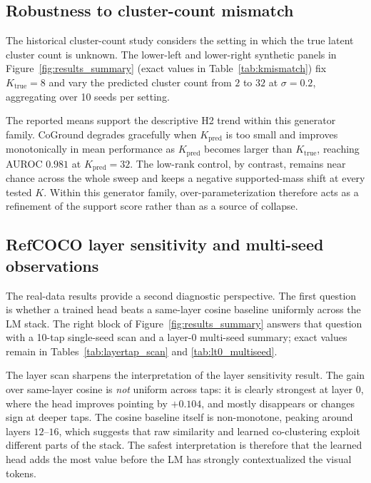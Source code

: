 \documentclass[11pt,a4paper]{article}
\begin{document}
\subsection{Robustness to cluster-count mismatch}

The historical cluster-count study considers the setting in which the true latent cluster count is unknown. The lower-left and lower-right synthetic panels in Figure~\ref{fig:results_summary} (exact values in Table~\ref{tab:kmismatch}) fix $K_{\mathrm{true}}=8$ and vary the predicted cluster count from $2$ to $32$ at $\sigma=0.2$, aggregating over 10 seeds per setting.

The reported means support the descriptive H2 trend within this generator family. CoGround degrades gracefully when $K_{\mathrm{pred}}$ is too small and improves monotonically in mean performance as $K_{\mathrm{pred}}$ becomes larger than $K_{\mathrm{true}}$, reaching AUROC $0.981$ at $K_{\mathrm{pred}}=32$. The low-rank control, by contrast, remains near chance across the whole sweep and keeps a negative supported-mass shift at every tested $K$. Within this generator family, over-parameterization therefore acts as a refinement of the support score rather than as a source of collapse.

\subsection{RefCOCO layer sensitivity and multi-seed observations}

The real-data results provide a second diagnostic perspective. The first question is whether a trained head beats a same-layer cosine baseline uniformly across the LM stack. The right block of Figure~\ref{fig:results_summary} answers that question with a 10-tap single-seed scan and a layer-$0$ multi-seed summary; exact values remain in Tables~\ref{tab:layertap_scan} and \ref{tab:lt0_multiseed}.

The layer scan sharpens the interpretation of the layer sensitivity result. The gain over same-layer cosine is \emph{not} uniform across taps: it is clearly strongest at layer $0$, where the head improves pointing by $+0.104$, and mostly disappears or changes sign at deeper taps. The cosine baseline itself is non-monotone, peaking around layers $12$--$16$, which suggests that raw similarity and learned co-clustering exploit different parts of the stack. The safest interpretation is therefore that the learned head adds the most value before the LM has strongly contextualized the visual tokens.
\end{document}
